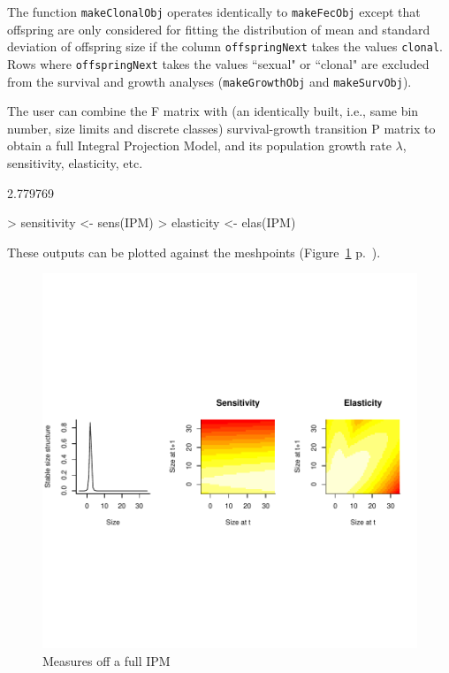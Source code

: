 \documentclass{article}
\begin{document}
The function {\tt makeClonalObj} operates identically to {\tt makeFecObj} except that offspring are only considered for fitting the distribution of mean and standard deviation of offspring size if the column {\tt offspringNext} takes the values {\tt clonal}. Rows where {\tt offspringNext} takes the values ``sexual" or ``clonal" are excluded from the survival and growth analyses ({\tt makeGrowthObj} and {\tt makeSurvObj}).

The user can combine the F matrix with (an identically built, i.e., same bin number, size limits and discrete classes) survival-growth transition P matrix to obtain a full Integral Projection Model, and its population growth rate $\lambda$, sensitivity, elasticity, etc. 
\begin{Schunk}
\begin{Soutput}
[1] 2.779769
\end{Soutput}
\begin{Sinput}
> sensitivity <- sens(IPM)
> elasticity <- elas(IPM)
\end{Sinput}
\end{Schunk}
These outputs can be plotted against the meshpoints (Figure~\ref{fig:four} p.~\pageref{fig:four}).
\begin{figure}
\begin{center}
\includegraphics{IPMpack_Vignette-fig4}
\end{center}
\caption{Measures off a full IPM}
\label{fig:four}
\end{figure}
\end{document}

